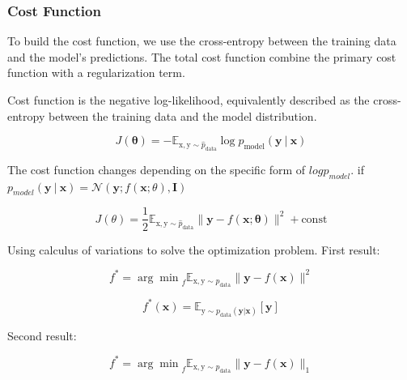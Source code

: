 
\subsubsection{Cost Function}
To build the cost function, we use the cross-entropy between the training data and the model’s predictions. The total cost function combine the primary cost function with a regularization term.

Cost function is the negative log-likelihood, equivalently described as the cross-entropy between the training data and the model distribution.

  \begin{equation} \tag{6.12}
   \label{eq_6_12}
    J( \bm{\theta} ) = - \mathbb{E} _ {\bm{\mathrm{x}}, \bm{\mathrm{y}} \sim \hat{p} _ \mathrm{data} } 
          \log p _ \mathrm{model} ( \bm{y}\ |\ \bm{x} )
  \end{equation}

The cost function changes depending on the specific form of $logp_{model}$.
if $p_{model}(\bm{y}\  |\ \bm{x})=\mathcal{N}(\bm{y};\mathit{f}(\bm{x};\theta),\bm{I})$

  \begin{equation} \tag{6.13}
   \label{eq_6_13}
    J( \theta ) = \frac{1}{2} \mathbb{E} _ {\bm{\mathrm{x}}, \bm{\mathrm{y}} \sim \hat{p}_ \mathrm{data}}
        \| \bm{y} - f( \bm{x} ; \bm{\theta} ) \| ^ 2 + \mathrm{const}
  \end{equation}

Using calculus of variations to solve the optimization problem.
First result:

  \begin{equation} \tag{6.14}
   \label{eq_6_14}
   f ^ * = {\arg \min} _ {f} \mathbb{E} _ {\bm{\mathrm{x}}, \bm{\mathrm{y}} \sim p _ \mathrm{data}} 
       \| \bm{y} - f( \bm{x} ) \| ^ 2
  \end{equation}
  
  \begin{equation} \tag{6.15}
   \label{eq_6_15}
    f ^ * (\bm{x}) = \mathbb{E} _ {\bm{\mathrm{y}} \sim p _ \mathrm{data} ( \bm{y} | \bm{x} ) } [ \bm{y} ]
  \end{equation}
  
Second result:

  \begin{equation} \tag{6.16}
   \label{eq_6_16}
   f ^ * = {\arg \min} _ {f} \mathbb{E} _ {\bm{\mathrm{x}}, \bm{\mathrm{y}} \sim p _ \mathrm{data}} 
       \| \bm{y} - f( \bm{x} ) \| _ 1
  \end{equation}

